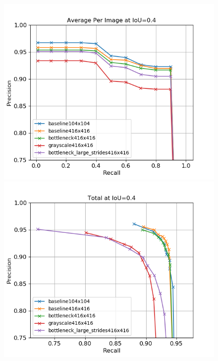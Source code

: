 \documentclass{article}
\begin{document}
\begin{figure}
	\begin{minipage}{0.45\textwidth}
	\includegraphics[width=\linewidth]{pr04}
	\end{minipage}
\begin{minipage}{0.45\textwidth}
	\includegraphics[width=\linewidth]{totalpr04}
\end{minipage}
\end{figure}
\end{document}
